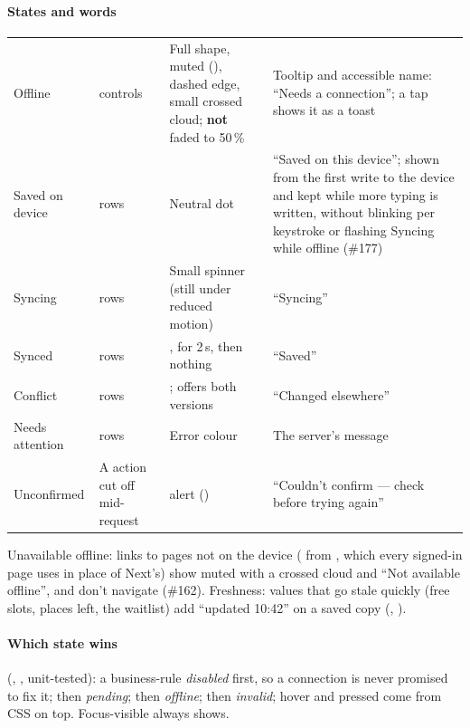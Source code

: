 \paragraph{States and words}
\begin{xltabular}{\linewidth}{@{}P{30mm} P{30mm} P{50mm} L@{}}
  \toprule
   &  &  & \\
  \midrule
  \endhead
  Offline &  controls & Full shape, muted (), dashed edge, small crossed cloud; \textbf{not} faded to 50\,\% & Tooltip and accessible name: ``Needs a connection''; a tap shows it as a toast\\
  Saved on device &  rows & Neutral dot & ``Saved on this device''; shown from the first write to the device and kept while more typing is written, without blinking per keystroke or flashing Syncing while offline (\#177)\\
  Syncing &  rows & Small spinner (still under reduced motion) & ``Syncing''\\
  Synced &  rows & , for 2\,s, then nothing & ``Saved''\\
  Conflict &  rows & ; offers both versions & ``Changed elsewhere''\\
  Needs attention &  rows & Error colour & The server's message\\
  Unconfirmed & A  action cut off mid-request &  alert () & ``Couldn't confirm --- check before trying again''\\
  \bottomrule
\end{xltabular}
Unavailable offline: links to pages not on the device ( from , which every signed-in page uses in place of Next's) show muted with a crossed cloud and ``Not available offline'', and don't navigate (\#162). Freshness: values that go stale quickly (free slots, places left, the waitlist) add ``updated 10:42'' on a saved copy (, ).

\paragraph{Which state wins} (, , unit-tested):
a business-rule \emph{disabled} first, so a connection is never promised to fix it; then
\emph{pending}; then \emph{offline}; then \emph{invalid}; hover and pressed come from CSS on top.
Focus-visible always shows.

